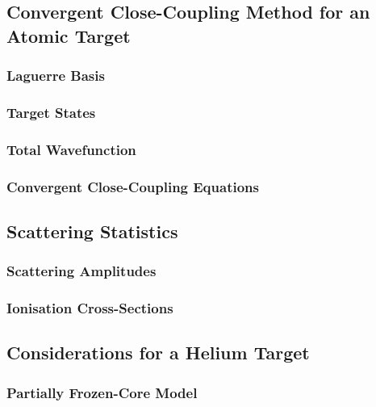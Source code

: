 \documentclass[draft]{article}
\begin{document}
\subsection{Convergent Close-Coupling Method for an Atomic Target}
\label{sec:th-ccc}

\subsubsection{Laguerre Basis}
\label{sec:th-ccc-lag}

\subsubsection{Target States}
\label{sec:th-ccc-target}

\subsubsection{Total Wavefunction}
\label{sec:th-ccc-total}

\subsubsection{Convergent Close-Coupling Equations}
\label{sec:th-ccc-eq}

\subsection{Scattering Statistics}
\label{sec:th-ccc-stat}

\subsubsection{Scattering Amplitudes}
\label{sec:th-ccc-amp}

\subsubsection{Ionisation Cross-Sections}
\label{sec:th-ccc-ion}

\subsection{Considerations for a Helium Target}
\label{sec:th-he}

\subsubsection{Partially Frozen-Core Model}
\label{sec:th-he-frozen}
\end{document}
